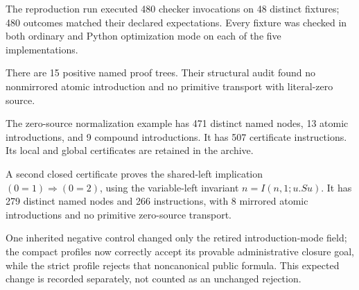 The reproduction run executed 480 checker invocations on 48 distinct fixtures; 480 outcomes matched their declared expectations. Every fixture was checked in both ordinary and Python optimization mode on each of the five implementations.

There are 15 positive named proof trees. Their structural audit found no nonmirrored atomic introduction and no primitive transport with literal-zero source.

The zero-source normalization example has 471 distinct named nodes, 13 atomic introductions, and 9 compound introductions. It has 507 certificate instructions. Its local and global certificates are retained in the archive.

A second closed certificate proves the shared-left implication $(0=1)\Rightarrow(0=2)$, using the variable-left invariant $n=I(n,1;u.Su)$. It has 279 distinct named nodes and 266 instructions, with 8 mirrored atomic introductions and no primitive zero-source transport.

One inherited negative control changed only the retired introduction-mode field; the compact profiles now correctly accept its provable administrative closure goal, while the strict profile rejects that noncanonical public formula. This expected change is recorded separately, not counted as an unchanged rejection.
